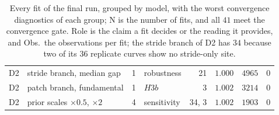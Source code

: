 \begin{table}[!tbp]
\begin{tabular}{@{}l>{\raggedright\arraybackslash}p{5.4cm}c>{\raggedright\arraybackslash}p{3.6cm}rrrr@{}}
        \rowsep%
        D2 & stride branch, median gap & 1 & robustness & 21 & $1.000$ & $4965$ & $0$ \\
        \rowsep%
        D2 & patch branch, fundamental & 1 & $H3b$ & 3 & $1.002$ & $3214$ & $0$ \\
        \rowsep%
        D2 & prior scales $\times0.5$, $\times2$ & 4 & sensitivity & 34, 3 & $1.002$ & $1903$ & $0$ \\
        \bottomrule
    \end{tabular}
\caption{Every fit of the final run, grouped by model, with the worst convergence diagnostics of each group; N is the number of fits, and all $41$ meet the convergence gate. Role is the claim a fit decides or the reading it provides, and Obs.\ the observations per fit; the stride branch of D2 has $34$ because two of its $36$ replicate curves show no stride-only site.}%
    \label{tab:bayesFitSummary}
\end{table}
